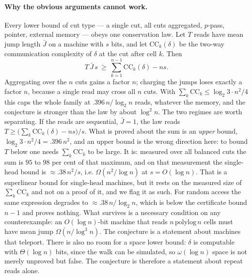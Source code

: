 \documentclass[11pt]{article}
\begin{document}
\paragraph{Why the obvious arguments cannot work.} Every lower bound of cut type --- a single cut,
all cuts aggregated, $p$-pass, pointer, external memory --- obeys one conservation law. Let $T$ reads
have mean jump length $\bar J$ on a machine with $s$ bits, and let $\mathrm{CC}_k(\delta)$ be the
two-way communication complexity of $\delta$ at the cut after cell $k$. Then
\[
T\,\bar J\,s\ \ge\ \sum_{k=1}^{n-1}\mathrm{CC}_k(\delta)-ns .
\]
Aggregating over the $n$ cuts gains a factor $n$; charging the jumps loses exactly a factor $n$,
because a single read may cross all $n$ cuts. With $\sum_k\mathrm{CC}_k\le\log_2 3\cdot n^2/4$ this
caps the whole family at $.396\,n/\log_2 n$ reads, whatever the memory, and the conjecture is
stronger than the law by about $\log^2 n$. The two regimes are worth separating. If the reads
are sequential, $\bar J=1$, the law reads $T\ge\big(\sum_k\mathrm{CC}_k(\delta)-ns\big)/s$. What is
proved about the sum is an \emph{upper} bound, $\log_2 3\cdot n^2/4=.396\,n^2$, and an upper bound is
the wrong direction here: to bound $T$ below one needs $\sum_k\mathrm{CC}_k$ to be large. It is:
measured over all balanced cuts the sum is $95$ to $98$ per cent of that maximum, and on that
measurement the single-head bound is $\approx.38\,n^2/s$, i.e. $\Omega(n^2/\log n)$ at
$s=O(\log n)$. That is a superlinear bound for single-head machines, but it rests on the measured size
of $\sum_k\mathrm{CC}_k$ and not on a proof of it, and we flag it as such. For random access the same
expression degrades to $\approx.38\,n/\log_2 n$, which is below the certificate bound $n-1$ and proves
nothing. What survives is a necessary condition on any counterexample: an
$O(\log n)$-bit machine that reads $n\,\mathrm{polylog}\,n$ cells must have mean jump
$\Omega(n/\log^3 n)$. The conjecture is a statement about machines that teleport. There is also no room for a space lower bound: $\delta$
is computable with $\Theta(\log n)$ bits, since the walk can be simulated, so $\omega(\log n)$ space
is not merely unproved but false. The conjecture is therefore a statement about repeat reads alone.
\end{document}
